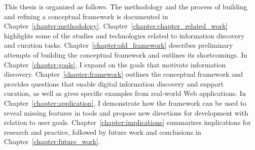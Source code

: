 This thesis is organized as follows. The methodology and the process of building and refining a conceptual framework is documented in Chapter~\ref{chapter:methodology}. Chapter~\ref{chapter:chapter_related_work} highlights some of the studies and technologies related to information discovery and curation tasks. Chapter~\ref{chapter:old_framework} describes preliminary attempts of building the conceptual framework and outlines its shortcomings. In Chapter~\ref{chapter:goals}, I expand on the goals that motivate information discovery. Chapter~\ref{chapter:framework} outlines the conceptual framework and provides questions that enable digital information discovery and support curation, as well as gives specific examples from real-world Web applications. In Chapter~\ref{chapter:application}, I demonstrate how the framework can be used to reveal missing features in tools and propose new directions for development with relation to user goals. Chapter~\ref{chapter:implications} summarizes implications for research and practice, followed by future work and conclusions in Chapter~\ref{chapter:future_work}.




